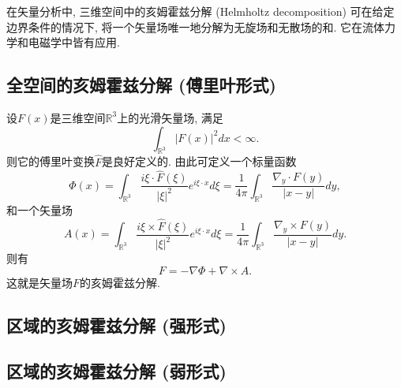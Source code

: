 
在矢量分析中, 三维空间中的亥姆霍兹分解 (Helmholtz decomposition) 可在给定边界条件的情况下, 将一个矢量场唯一地分解为无旋场和无散场的和. 它在流体力学和电磁学中皆有应用.

\subsection{全空间的亥姆霍兹分解 (傅里叶形式)}
设$F(x)$是三维空间$\mathbb{R}^3$上的光滑矢量场, 满足
$$
\int_{\mathbb{R}^3}|F(x)|^2dx<\infty.
$$
则它的傅里叶变换$\hat F$是良好定义的. 由此可定义一个标量函数
$$
\Phi(x)
=\int_{\mathbb{R}^3}\frac{i\xi\cdot\hat F(\xi)}{|\xi|^2}e^{i\xi\cdot x}d\xi
=\frac{1}{4\pi}\int_{\mathbb{R}^3}\frac{\nabla_y\cdot F(y)}{|x-y|}dy,
$$
和一个矢量场
$$
A(x)
=\int_{\mathbb{R}^3}\frac{i\xi\times\hat F(\xi)}{|\xi|^2}e^{i\xi\cdot x}d\xi
=\frac{1}{4\pi}\int_{\mathbb{R}^3}\frac{\nabla_y\times F(y)}{|x-y|}dy.
$$
则有
$$
F=-\nabla\Phi+\nabla\times A.
$$
这就是矢量场$F$的亥姆霍兹分解.

\subsection{区域的亥姆霍兹分解 (强形式)}

\subsection{区域的亥姆霍兹分解 (弱形式)}

